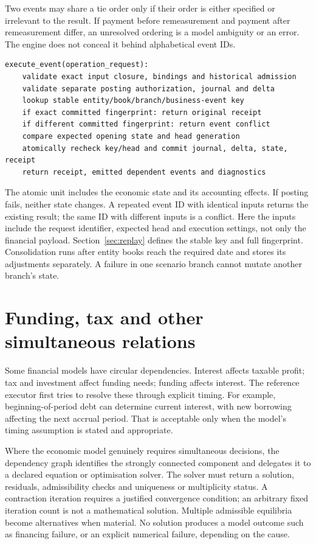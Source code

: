 Two events may share a tie order only if their order is either specified or
irrelevant to the result. If payment before remeasurement and payment after
remeasurement differ, an unresolved ordering is a model ambiguity or an error.
The engine does not conceal it behind alphabetical event IDs.

\begin{lstlisting}
execute_event(operation_request):
    validate exact input closure, bindings and historical admission
    validate separate posting authorization, journal and delta
    lookup stable entity/book/branch/business-event key
    if exact committed fingerprint: return original receipt
    if different committed fingerprint: return event conflict
    compare expected opening state and head generation
    atomically recheck key/head and commit journal, delta, state, receipt
    return receipt, emitted dependent events and diagnostics
\end{lstlisting}

The atomic unit includes the economic state and its accounting effects.
If posting fails, neither state changes. A repeated event ID with identical
inputs returns the existing result; the same ID with different inputs is a
conflict. Here the inputs include the request identifier, expected head and
execution settings, not only the financial payload. Section~\ref{sec:replay}
defines the stable key and full fingerprint. Consolidation runs after entity books reach the required date and
stores its adjustments separately. A failure in one scenario branch cannot
mutate another branch's state.


\section{Funding, tax and other simultaneous relations}

Some financial models have circular dependencies. Interest affects taxable
profit; tax and investment affect funding needs; funding affects interest.
The reference executor first tries to resolve these through explicit timing.
For example, beginning-of-period debt can determine current interest, with
new borrowing affecting the next accrual period. That is acceptable only when
the model's timing assumption is stated and appropriate.

Where the economic model genuinely requires simultaneous decisions, the
dependency graph identifies the strongly connected component and delegates it
to a declared equation or optimisation solver. The solver must return a
solution, residuals, admissibility checks and uniqueness or multiplicity
status. A contraction iteration requires a justified convergence condition;
an arbitrary fixed iteration count is not a mathematical solution. Multiple
admissible equilibria become alternatives when material. No solution produces
a model outcome such as financing failure, or an explicit numerical failure,
depending on the cause.

